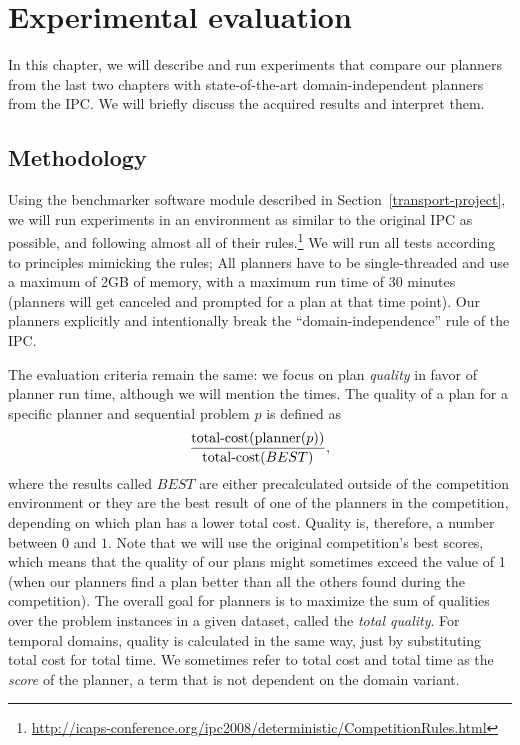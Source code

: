\chapter{Experimental evaluation}

In this chapter, we will describe and run experiments
that compare our planners from the last two chapters
with state-of-the-art domain-independent planners from the IPC.
We will briefly discuss the acquired results and interpret them.

\section{Methodology}

Using the benchmarker software module described in Section~\ref{transport-project}, we will run experiments in an
environment as similar to the original
IPC as possible, and following almost all of their rules.\footnote{\url{http://icaps-conference.org/ipc2008/deterministic/CompetitionRules.html}}
We will run all tests according to principles mimicking the rules;
All planners have to be single-threaded and use a maximum of 2GB of memory, with a maximum run time of 30 minutes (planners will
get canceled and prompted for a plan at that time point).
Our planners explicitly and intentionally break the ``domain-independence'' rule of the IPC.

The evaluation criteria remain the same:
we focus on plan \textit{quality} in favor of planner run time,
although we will mention the times.
The quality of a plan for a specific planner and sequential problem $p$ is defined as
$$\frac{\textrm{total-cost}(\textrm{planner}(p))}{\textrm{total-cost}(BEST)},$$
where the results called $BEST$
are either precalculated outside of the competition environment or they are the best result of one of the planners in the competition, depending on which plan has a lower total cost.
Quality is, therefore, a number between $0$ and $1$.
Note that we will use the original competition's best scores,
which means that the quality of our plans
might sometimes exceed the value of 1
(when our planners find a plan better than all the others found during the competition).
The overall goal for planners is to maximize the sum of qualities over the problem instances in a given dataset, called the \textit{total quality}.
For temporal domains, quality is calculated in the same way, just by substituting total cost
for total time. We sometimes refer to total cost and total time as the \textit{score} of the planner, a term that is not dependent on the domain variant.

